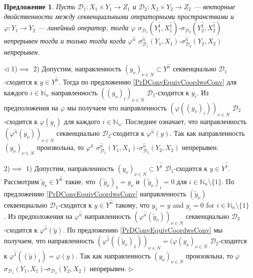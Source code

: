 \documentclass[12pt]{article}
\newtheorem{proposition}[theorem]{Предложение}
\newenvironment{proof}{\par $\triangleleft$}{$\triangleright$}
\begin{document}
\begin{proposition}\label{PrDContEquivCoordwsCont}
Пусть $\mathcal{D}_1:X_1\times Y_1\to Z_1$ и $\mathcal{D}_2:X_2\times Y_2\to Z_2$ --- векторные двойственности между  секвенциальными операторными пространствами и $\varphi:Y_1\to Y_2$ --- линейный оператор, тогда $\varphi$ $\sigma_{\mathcal{D}_1}(Y_1^{\wideparen{1}},X_1^{\wideparen{1}})$-$\sigma_{\mathcal{D}_2}(Y_2^{\wideparen{1}},X_2^{\wideparen{1}})$ непрерывен тогда и только тогда когда $\varphi^{\wideparen{n}}$ $\sigma_{\mathcal{D}_1}^{\wideparen{n}}(Y_1,X_1)$-$\sigma_{\mathcal{D}_2}^{\wideparen{n}}(Y_2,X_2)$ непрерывен.
\end{proposition}
\begin{proof}
1)$\implies$ 2) Допустим, направленность $(y_\nu)_{\nu\in N}\subset Y^{\wideparen{n}}$ секвенциально $\mathcal{D}_1$-сходится к $y\in Y^{\wideparen{n}}$. Тогда по предложению \ref{PrDConvEquivCoordwsConv} для каждого $i\in\mathbb{N}_n$ направленность $((y_\nu)_i)_{\nu\in N}$ $\mathcal{D}_1$-сходится к $y_i$. Из предположения на $\varphi$ мы получаем что направленность $(\varphi((y_\nu)_i))_{\nu\in N}$ $\mathcal{D}_2$-сходится к $\varphi(y_i)$ для каждого $i\in\mathbb{N}_n$. Последнее означает, что направленность $(\varphi^{\wideparen{n}}(y_\nu))_{\nu\in N}$ секвенциально $\mathcal{D}_2$-сходится к $\varphi^{\wideparen{n}}(y)$. Так как направленность $(y_\nu)_{\nu\in N}$ произвольна, то $\varphi^{\widehat{n}}$ $\sigma_{\mathcal{D}_1}^{\wideparen{n}}(Y_1,X_1)$-$\sigma_{\mathcal{D}_2}^{\wideparen{n}}(Y_2,X_2)$ непрерывен.

2)$\implies$ 1) Допустим, направленность $(y_\nu)_{\nu\in N}\subset Y^{\wideparen{1}}$ $\mathcal{D}_1$-сходится к $y\in Y^{\wideparen{1}}$. Рассмотрим $\widetilde{y}_\nu\in Y^{\wideparen{n}}$ такие, что $(\widetilde{y}_\nu)_1=y_\nu$ и $(\widetilde{y}_\nu)_i=0$ для $i\in\mathbb{N}_n\setminus\{1\}$. По предложению \ref{PrDConvEquivCoordwsConv} направленность $(\widetilde{y}_\nu)$ секвенциально $\mathcal{D}_1$-сходится к $y\in Y^{\wideparen{n}}$ такому, что $y_1=y$ and $y_i=0$ for $i\in\mathbb{N}_n\setminus\{1\}$. Из предположения на $\varphi^{\wideparen{n}}$ направленность $(\varphi^{\wideparen{n}}(\widetilde{y}_\nu))_{\nu\in N}$ секвенциально $\mathcal{D}_2$-сходится к $\varphi^{\wideparen{n}}(\widetilde{y})$. По предложению \ref{PrDConvEquivCoordwsConv} мы получаем, что направленность $(\varphi^{\wideparen{1}}((\widetilde{y}_\nu)_1))_{\nu\in N}=(\varphi(y_\nu)_{\nu\in N}$ $\mathcal{D}_2$-сходится к $\varphi^{\wideparen{1}}((\widetilde{y})_1)=\varphi(y)$. Так как направленность $(y_\nu)_{\nu\in N}$ произовльна, то $\varphi$ $\sigma_{\mathcal{D}_1}(Y_1,X_1)$-$\sigma_{\mathcal{D}_2}(Y_2,X_2)$ непрерывен.
\end{proof}
\end{document}

